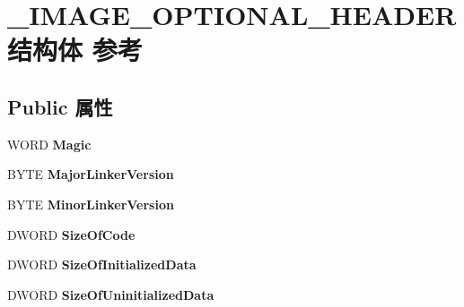 \hypertarget{struct___i_m_a_g_e___o_p_t_i_o_n_a_l___h_e_a_d_e_r}{}\section{\+\_\+\+I\+M\+A\+G\+E\+\_\+\+O\+P\+T\+I\+O\+N\+A\+L\+\_\+\+H\+E\+A\+D\+E\+R结构体 参考}
\label{struct___i_m_a_g_e___o_p_t_i_o_n_a_l___h_e_a_d_e_r}
\subsection*{Public 属性}
\begin{DoxyCompactItemize}
\item 
\mbox{\label{struct___i_m_a_g_e___o_p_t_i_o_n_a_l___h_e_a_d_e_r_aad8a4a504985601b03158526edc50606}} 
W\+O\+RD {\bfseries Magic}
\item 
\mbox{\label{struct___i_m_a_g_e___o_p_t_i_o_n_a_l___h_e_a_d_e_r_adfecf203c13bdc63f1ff2d2da929c34a}} 
B\+Y\+TE {\bfseries Major\+Linker\+Version}
\item 
\mbox{\label{struct___i_m_a_g_e___o_p_t_i_o_n_a_l___h_e_a_d_e_r_a063cadfb6e83c54ae1013bfcbcc39333}} 
B\+Y\+TE {\bfseries Minor\+Linker\+Version}
\item 
\mbox{\label{struct___i_m_a_g_e___o_p_t_i_o_n_a_l___h_e_a_d_e_r_a06677e04339c441c6c60fe3b44f44ec6}} 
D\+W\+O\+RD {\bfseries Size\+Of\+Code}
\item 
\mbox{\label{struct___i_m_a_g_e___o_p_t_i_o_n_a_l___h_e_a_d_e_r_afe1799f5b4f6506737f3bcbee98a6899}} 
D\+W\+O\+RD {\bfseries Size\+Of\+Initialized\+Data}
\item 
\mbox{\label{struct___i_m_a_g_e___o_p_t_i_o_n_a_l___h_e_a_d_e_r_a98cb6b6de771471bdff9d0b3d5e8e0e6}} 
D\+W\+O\+RD {\bfseries Size\+Of\+Uninitialized\+Data}
\item 
\mbox{\label{struct___i_m_a_g_e___o_p_t_i_o_n_a_l___h_e_a_d_e_r_a68d3ff18e90131fbe88111dfee17b1f1}} 

\end{DoxyCompactItemize}
